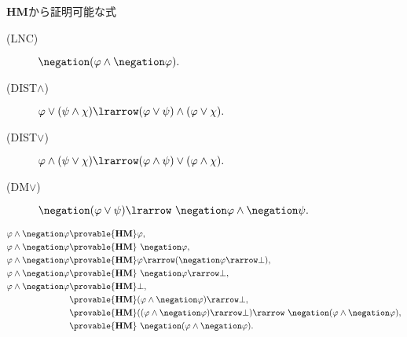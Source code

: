 	{\bf HM}から証明可能な式
	\begin{description}
		\item[(LNC)] $\negation (\varphi \wedge \negation \varphi).$
		\item[(DIST$\wedge$)] $\varphi \vee (\psi \wedge \chi) 
			\lrarrow (\varphi \vee \psi) \wedge (\varphi \vee \chi).$
		\item[(DIST$\vee$)] $\varphi \wedge (\psi \vee \chi) 
			\lrarrow (\varphi \wedge \psi) \vee (\varphi \wedge \chi).$
		\item[(DM$\vee$)] $\negation (\varphi \vee \psi) \lrarrow
			\ \negation \varphi \wedge \negation \psi.$
	\end{description}
	
	\begin{sketch}[LNC]
		\begin{align}
			\varphi \wedge \negation \varphi &\provable{\mbox{{\bf HM}}} \varphi, \\
			\varphi \wedge \negation \varphi &\provable{\mbox{{\bf HM}}}\ \negation \varphi, \\
			\varphi \wedge \negation \varphi &\provable{\mbox{{\bf HM}}}
				\varphi \rarrow (\negation \varphi \rarrow \bot), \\
			\varphi \wedge \negation \varphi &\provable{\mbox{{\bf HM}}}\ \negation \varphi \rarrow \bot, \\
			\varphi \wedge \negation \varphi &\provable{\mbox{{\bf HM}}} \bot, \\
			&\provable{\mbox{{\bf HM}}} (\varphi \wedge \negation \varphi) \rarrow \bot, \\
			&\provable{\mbox{{\bf HM}}} ((\varphi \wedge \negation \varphi) \rarrow \bot)
				\rarrow\ \negation (\varphi \wedge \negation \varphi), \\
			&\provable{\mbox{{\bf HM}}}\ \negation (\varphi \wedge \negation \varphi).
		\end{align}
		\QED
	\end{sketch}
	
